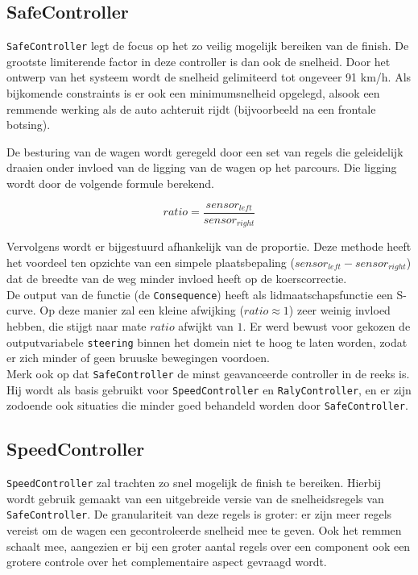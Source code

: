\documentclass[10pt,a4paper]{article}
\begin{document}
		\subsection{SafeController}
			\texttt{SafeController} legt de focus op het zo veilig mogelijk bereiken van de finish. De grootste limiterende factor in deze controller is dan ook de snelheid. Door het ontwerp van het systeem wordt de snelheid gelimiteerd tot ongeveer 91 km/h. Als bijkomende constraints is er ook een minimumsnelheid opgelegd, alsook een remmende werking als de auto achteruit rijdt (bijvoorbeeld na een frontale botsing).

			De besturing van de wagen wordt geregeld door een set van regels die geleidelijk draaien onder invloed van de ligging van de wagen op het parcours. Die ligging wordt door de volgende formule berekend.

			\begin{equation}
	ratio = \frac{sensor_{left}}{sensor_{right}}
			\end{equation}

			Vervolgens wordt er bijgestuurd afhankelijk van de proportie. Deze methode heeft het voordeel ten opzichte van een simpele plaatsbepaling ($sensor_{left} - sensor_{right}$) dat de breedte van de weg minder invloed heeft op de koerscorrectie.\\
			De output van de functie (de \texttt{Consequence}) heeft als lidmaatschapsfunctie een S-curve. Op deze manier zal een kleine afwijking ($ratio \approx 1$) zeer weinig invloed hebben, die stijgt naar mate $ratio$ afwijkt van $1$. Er werd bewust voor gekozen de outputvariabele \texttt{steering} binnen het domein niet te hoog te laten worden, zodat er zich minder of geen bruuske bewegingen voordoen.\\

			Merk ook op dat \texttt{SafeController} de minst geavanceerde controller in de reeks is. Hij wordt als basis gebruikt voor \texttt{SpeedController} en \texttt{RalyController}, en er zijn zodoende ook situaties die minder goed behandeld worden door \texttt{SafeController}.\\

		\subsection{SpeedController}
			\texttt{SpeedController} zal trachten zo snel mogelijk de finish te bereiken. Hierbij wordt gebruik gemaakt van een uitgebreide versie van de snelheidsregels van \texttt{SafeController}. De granulariteit van deze regels is groter: er zijn meer regels vereist om de wagen een gecontroleerde snelheid mee te geven. Ook het remmen schaalt mee, aangezien er bij een groter aantal regels over een component ook een grotere controle over het complementaire aspect gevraagd wordt.\\
\end{document}
